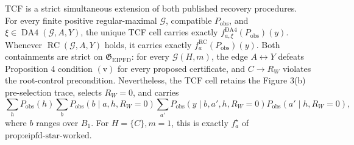 TCF is a strict simultaneous extension of both published recovery procedures. For every finite positive regular-maximal \(\mathcal G\), compatible \(P_{\mathrm{obs}}\), and \(\xi\in\operatorname{DA4}(\mathcal G,A,Y)\), the unique TCF cell carries exactly \(f^{\mathrm{DA4}}_{a,\xi}(P_{\mathrm{obs}})(y)\). Whenever \(\operatorname{RC}(\mathcal G,A,Y)\) holds, it carries exactly \(f_a^{\mathrm{RC}}(P_{\mathrm{obs}})(y)\). Both containments are strict on \(\mathfrak G_{\mathrm{EIPFD}}\): for every \(\mathcal G(H,m)\), the edge \(A\leftrightarrow Y\) defeats Proposition 4 condition \(\mathrm{(v)}\) for every proposed certificate, and \(C\to R_W\) violates the root-control precondition. Nevertheless, the TCF cell retains the Figure 3(b) pre-selection trace, selects \(R_W=0\), and carries \[\sum_{h}P_{\mathrm{obs}}(h)\sum_bP_{\mathrm{obs}}(b\mid a,h,R_W=0)\sum_{a'}P_{\mathrm{obs}}(y\mid b,a',h,R_W=0)P_{\mathrm{obs}}(a'\mid h,R_W=0),\] where \(b\) ranges over \(B_1\). For \(H=\{C\},m=1\), this is exactly \(f_a^\star\) of \(\text{prop:eipfd-star-worked}\).